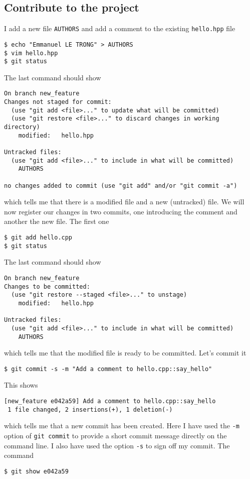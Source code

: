 \documentclass[a4paper]{article}
\begin{document}
\subsection{Contribute to the project}
I add a new file \texttt{AUTHORS} and add a comment to the existing \texttt{hello.hpp} file
\begin{verbatim}
$ echo "Emmanuel LE TRONG" > AUTHORS
$ vim hello.hpp
$ git status
\end{verbatim}
The last command should show
\begin{verbatim}
On branch new_feature
Changes not staged for commit:
  (use "git add <file>..." to update what will be committed)
  (use "git restore <file>..." to discard changes in working directory)
	modified:   hello.hpp

Untracked files:
  (use "git add <file>..." to include in what will be committed)
	AUTHORS

no changes added to commit (use "git add" and/or "git commit -a")
\end{verbatim}
which tells me that there is a modified file and a new (untracked) file.
We will now register our changes in two commits, one introducing the comment and
another the new file. The first one
\begin{verbatim}
$ git add hello.cpp
$ git status
\end{verbatim}
The last command should show
\begin{verbatim}
On branch new_feature
Changes to be committed:
  (use "git restore --staged <file>..." to unstage)
	modified:   hello.hpp

Untracked files:
  (use "git add <file>..." to include in what will be committed)
	AUTHORS
\end{verbatim}
which tells me that the modified file is ready to be committed.
Let's commit it
\begin{verbatim}
$ git commit -s -m "Add a comment to hello.cpp::say_hello"
\end{verbatim}
This shows
\begin{verbatim}
[new_feature e042a59] Add a comment to hello.cpp::say_hello
 1 file changed, 2 insertions(+), 1 deletion(-)
\end{verbatim}
which tells me that a new commit has been created. Here I have used the
\texttt{-m} option of \texttt{git commit} to provide a short commit message
directly on the command line. I also have used the option \texttt{-s} to sign
off my commit. The command
\begin{verbatim}
$ git show e042a59
\end{verbatim}
\end{document}
